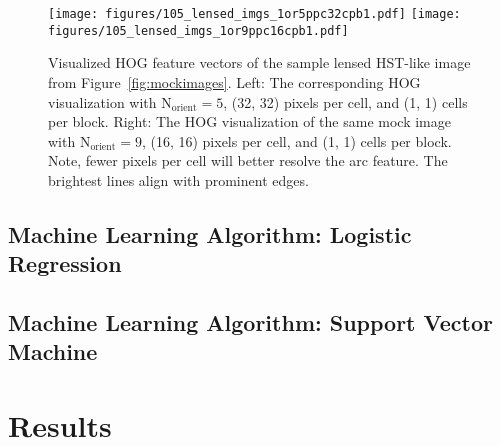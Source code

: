 \documentclass{emulateapj}
\begin{document}
\begin{figure*}[t]\label{fig:hogvisual}
\begin{center}
\texttt{[image: figures/105\_lensed\_imgs\_1or5ppc32cpb1.pdf]}\hspace{-20pt}
\texttt{[image: figures/105\_lensed\_imgs\_1or9ppc16cpb1.pdf]}\hspace{-20pt}
\caption{Visualized HOG feature vectors of the sample lensed HST-like
  image from Figure~\ref{fig:mockimages}.  Left: The corresponding HOG
  visualization with N$_\text{orient}=5$, (32, 32) pixels per cell,
  and (1, 1) cells per block.  Right: The HOG visualization of the
  same mock image with N$_\text{orient}=9$, (16, 16) pixels per cell,
  and (1, 1) cells per block.  Note, fewer pixels per cell will better
  resolve the arc feature.  The brightest lines align with prominent
  edges.}
\end{center}
\end{figure*}


\subsection{Machine Learning Algorithm: Logistic Regression}



\subsection{Machine Learning Algorithm: Support Vector Machine}



\section{Results}
\label{sec:results}
\end{document}
